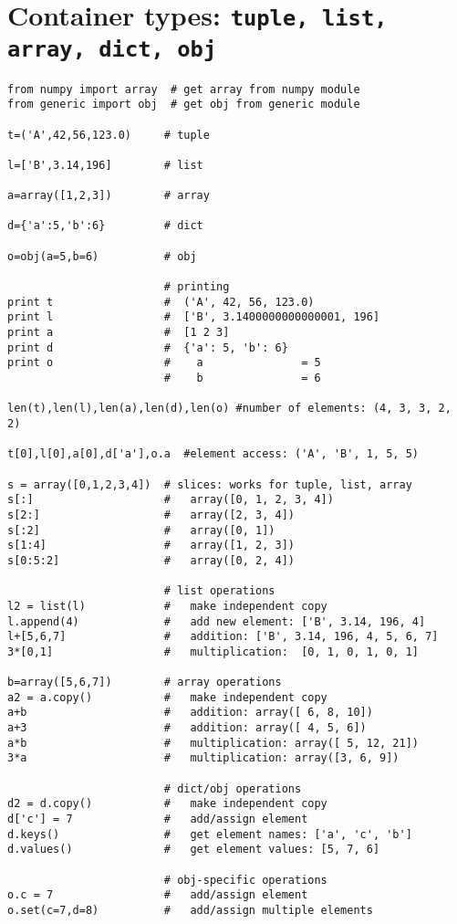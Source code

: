 \documentclass[oneside,11pt]{memoir}
\numberwithin{equation}{section}
\begin{document}
\section{Container types: \texttt{tuple, list, array, dict, obj}}
\begin{shaded}
\begin{verbatim}
from numpy import array  # get array from numpy module
from generic import obj  # get obj from generic module

t=('A',42,56,123.0)     # tuple

l=['B',3.14,196]        # list

a=array([1,2,3])        # array

d={'a':5,'b':6}         # dict

o=obj(a=5,b=6)          # obj

                        # printing
print t                 #  ('A', 42, 56, 123.0)
print l                 #  ['B', 3.1400000000000001, 196]
print a                 #  [1 2 3]
print d                 #  {'a': 5, 'b': 6}
print o                 #    a               = 5
                        #    b               = 6

len(t),len(l),len(a),len(d),len(o) #number of elements: (4, 3, 3, 2, 2)

t[0],l[0],a[0],d['a'],o.a  #element access: ('A', 'B', 1, 5, 5)

s = array([0,1,2,3,4])  # slices: works for tuple, list, array
s[:]                    #   array([0, 1, 2, 3, 4])
s[2:]                   #   array([2, 3, 4])
s[:2]                   #   array([0, 1])
s[1:4]                  #   array([1, 2, 3])
s[0:5:2]                #   array([0, 2, 4])

                        # list operations
l2 = list(l)            #   make independent copy
l.append(4)             #   add new element: ['B', 3.14, 196, 4]
l+[5,6,7]               #   addition: ['B', 3.14, 196, 4, 5, 6, 7]
3*[0,1]                 #   multiplication:  [0, 1, 0, 1, 0, 1]

b=array([5,6,7])        # array operations
a2 = a.copy()           #   make independent copy
a+b                     #   addition: array([ 6, 8, 10])
a+3                     #   addition: array([ 4, 5, 6])
a*b                     #   multiplication: array([ 5, 12, 21])
3*a                     #   multiplication: array([3, 6, 9])

                        # dict/obj operations
d2 = d.copy()           #   make independent copy
d['c'] = 7              #   add/assign element 
d.keys()                #   get element names: ['a', 'c', 'b']
d.values()              #   get element values: [5, 7, 6]

                        # obj-specific operations
o.c = 7                 #   add/assign element
o.set(c=7,d=8)          #   add/assign multiple elements

\end{verbatim}
\end{shaded}
\end{document}
